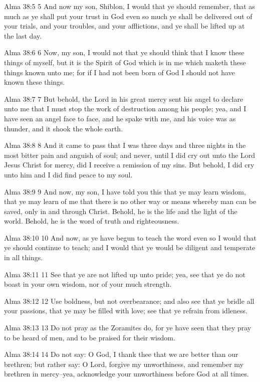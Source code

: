 Alma 38:5
 5 And now my son, Shiblon, I would that ye should remember, that
as much as ye shall put your trust in God even so much ye shall
be delivered out of your trials, and your troubles, and your
afflictions, and ye shall be lifted up at the last day.

Alma 38:6
 6 Now, my son, I would not that ye should think that I know
these things of myself, but it is the Spirit of God which is in
me which maketh these things known unto me; for if I had not been
born of God I should not have known these things.

Alma 38:7
 7 But behold, the Lord in his great mercy sent his angel to
declare unto me that I must stop the work of destruction among
his people; yea, and I have seen an angel face to face, and he
spake with me, and his voice was as thunder, and it shook the
whole earth.

Alma 38:8
 8 And it came to pass that I was three days and three nights in
the most bitter pain and anguish of soul; and never, until I did
cry out unto the Lord Jesus Christ for mercy, did I receive a
remission of my sins. But behold, I did cry unto him and I did
find peace to my soul.

Alma 38:9
 9 And now, my son, I have told you this that ye may learn
wisdom, that ye may learn of me that there is no other way or
means whereby man can be saved, only in and through Christ.
Behold, he is the life and the light of the world. Behold, he is
the word of truth and righteousness.

Alma 38:10
 10 And now, as ye have begun to teach the word even so I would
that ye should continue to teach; and I would that ye would be
diligent and temperate in all things.

Alma 38:11
 11 See that ye are not lifted up unto pride; yea, see that ye do
not boast in your own wisdom, nor of your much strength.

Alma 38:12
 12 Use boldness, but not overbearance; and also see that ye
bridle all your passions, that ye may be filled with love; see
that ye refrain from idleness.

Alma 38:13
 13 Do not pray as the Zoramites do, for ye have seen that they
pray to be heard of men, and to be praised for their wisdom.

Alma 38:14
 14 Do not say: O God, I thank thee that we are better than our
brethren; but rather say: O Lord, forgive my unworthiness, and
remember my brethren in mercy--yea, acknowledge your unworthiness
before God at all times.

